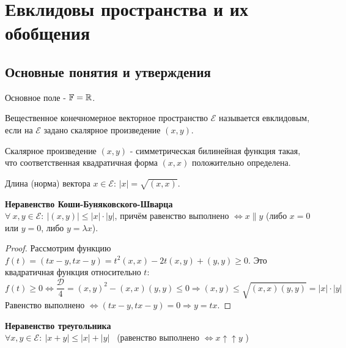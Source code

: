 \section{Евклидовы пространства и их обобщения}
\subsection{Основные понятия и утверждения}
Основное поле - $\mathbb{F} = \mathbb{R}$.
\begin{definition}
    Вещественное конечномерное векторное пространство $\mathcal{E}$ называется евклидовым, если на $\mathcal{E}$ задано скалярное произведение $(x,y)$.
\end{definition}
\begin{definition}
    Скалярное произведение $(x,y)$ - симметрическая билинейная функция такая, что соответственная квадратичная форма $(x,x)$ положительно определена.
\end{definition} 
\begin{definition}
    Длина (норма) вектора $x\in\mathcal{E}$: $|x| = \sqrt{(x,x)}$.
\end{definition}
\begin{theorem} \textbf{Неравенство Коши-Буняковского-Шварца}\\
    $\forall \ x,y\in\mathcal{E}: \ |(x,y)|\leqslant|x|\cdot|y|$, причём равенство выполнено $\Leftrightarrow x \parallel y$ (либо $x = 0$ или $y = 0$, либо $y = \lambda x$).
\end{theorem}
\begin{proof}
    Рассмотрим функцию $f(t) = (tx-y, tx-y) = t^2(x,x) -2t(x,y) + (y,y) \geqslant 0$. Это квадратичная функция относительно $t$:
    $$f(t)\geqslant 0 \Leftrightarrow \frac{\mathcal{D}}{4} = (x,y)^2 - (x,x)(y,y) \leqslant 0 \Rightarrow (x,y) \leq \sqrt{(x,x)(y,y)} = |x|\cdot|y|$$
    Равенство выполнено $\Leftrightarrow (tx-y, tx-y) = 0 \Rightarrow y = tx$.
\end{proof}
\begin{theorem} \textbf{Неравенство треугольника}\\
    $\forall x, y \in \mathcal{E} : \ |x+y| \leq |x| + |y|$ \ (равенство выполнено $\Longleftrightarrow x \uparrow \uparrow y$ ) 
\end{theorem}
